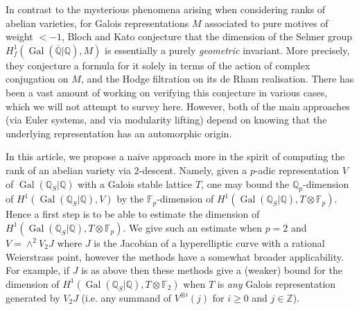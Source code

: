 \documentclass[11pt]{amsart}
\def\Q{\mathbb Q}
\def\F{\mathbb F}
\theoremstyle{plain}
\theoremstyle{definition}
\DeclareMathOperator{\Gal}{Gal}
\newcommand{\ad}{\mathrm{ad}}
\begin{document}
In contrast to the mysterious phenomena arising when considering ranks of abelian varieties, for Galois representations $M$ associated to pure motives of weight $<-1$, Bloch and Kato conjecture that the dimension of the Selmer group $H^1 _f (\Gal (\overline{\Q }|\Q ),M)$ is essentially a purely \textit{geometric} invariant. More precisely, they conjecture a formula for it solely in terms of the action of complex conjugation on $M$, and the Hodge filtration on its de Rham realisation. There has been a vast amount of working on verifying this conjecture in various cases, which we will not attempt to survey here. However, both of the main approaches (via Euler systems, and via modularity lifting) depend on knowing that the underlying representation has an automorphic origin.


In this article, we propose a naive approach more in the spirit of computing the rank of an abelian variety via $2$-descent. Namely, given a $p$-adic representation $V$ of $\Gal (\Q _S |\Q )$ with a Galois stable lattice $T$, one may bound the $\Q _p $-dimension of $H^1 (\Gal (\Q _S |\Q ),V)$ by the $\F _p $-dimension of $H^1 (\Gal (\Q _S |\Q ),T\otimes \F _p )$. Hence a first step is to be able to estimate the dimension of $H^1 (\Gal (\Q _S |\Q ),T\otimes \F _p )$. We give such an estimate when $p=2$ and $V=\wedge ^2 V_2 J$ where $J$ is the Jacobian of a hyperelliptic curve with a rational Weierstrass point, however the methods have a somewhat broader applicability. For example, if $J$ is as above then these methods give a (weaker) bound for the dimension of $H^1 (\Gal (\Q _S |\Q ),T\otimes \F _2 )$ when $T$ is \textit{any} Galois representation generated by $V_2 J$ (i.e. any summand of $V^{\otimes i}(j)$ for $i\geq 0$ and $j\in \mathbb{Z}$).
\end{document}
